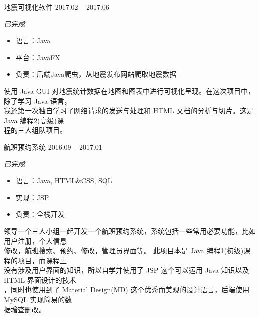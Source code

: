 \documentclass[hidelinks__VERSION__]{adamyi-cv}
\begin{document}
\begin{entrylist}

\entry
{\heir 地震可视化软件}
{2017.02 -- 2017.06}
{\emph{\hei 已完成}
\begin{itemize}
    \item \hei 语言：Java
    \item \hei 平台：JavaFX
    \item \hei 负责：后端Java爬虫，从地震发布网站爬取地震数据
\end{itemize}
{\hei
使用 Java GUI 对地震统计数据在地图和图表中进行可视化呈现。在这次项目中，除了学习 Java 语言，\\
我还第一次独自学习了网络请求的发送与处理和 HTML 文档的分析与切片。这是 Java 编程2(高级)课\\
程的三人组队项目。
}}


\entry
{\heir 航班预约系统}
{2016.09 -- 2017.01}
{\emph{\hei 已完成}
\begin{itemize}
    \item \hei 语言：Java, HTML\&CSS, SQL
    \item \hei 实现：JSP
    \item \hei 负责：全栈开发
\end{itemize}
{\hei
领导一个三人小组一起开发一个航班预约系统，系统包括一些常用必要功能，比如用户注册，个人信息\\
修改，航班搜索、预约、修改，管理员界面等。 此项目本是 Java 编程1(初级)课程的项目，而课程上\\
没有涉及用户界面的知识，所以自学并使用了 JSP 这个可以运用 Java 知识以及 HTML 界面设计的技术\\
，同时也使用到了 Material Design(MD) 这个优秀而美观的设计语言，后端使用 MySQL 实现简易的数\\
据增查删改。
}}


\end{entrylist}
\end{document}
